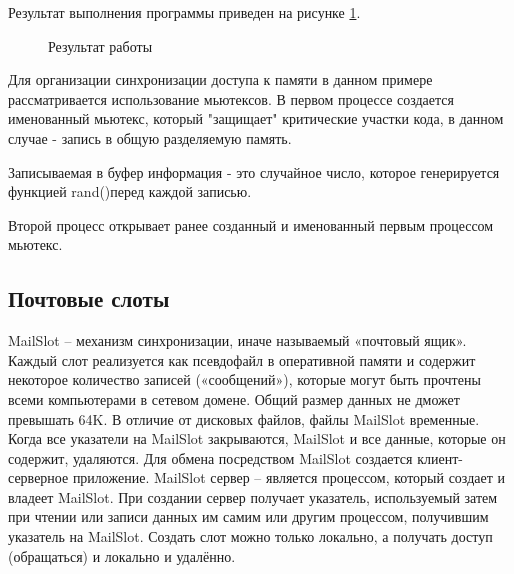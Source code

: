 \documentclass[a4paper]{article}
\begin{document}
	Результат выполнения программы приведен на рисунке \ref{img:task8}.
	\begin{figure}[h!]
		\caption{Результат работы}
		\label{img:task8}
	\end{figure}
	
	Для организации синхронизации доступа к памяти в данном примере рассматривается использование мьютексов. В первом процессе создается именованный мьютекс, который "защищает" критические участки кода, в данном случае - запись в общую разделяемую память.
	
	Записываемая в буфер информация - это случайное число, которое генерируется функцией rand()перед каждой записью.
	
	Второй процесс открывает ранее созданный и именованный первым процессом мьютекс.
	
\subsection{Почтовые слоты}
	MailSlot – механизм синхронизации, иначе называемый «почтовый ящик». Каждый слот реализуется как псевдофайл в оперативной памяти и содержит некоторое количество записей («сообщений»), которые могут быть прочтены всеми компьютерами в сетевом домене. Общий размер данных не дможет превышать 64K. В отличие от дисковых файлов, файлы MailSlot временные. Когда все указатели на MailSlot закрываются, MailSlot и все данные, которые он содержит, удаляются. Для обмена посредством MailSlot создается клиент-серверное приложение. MailSlot сервер – является процессом, который создает и владеет MailSlot. При создании сервер получает указатель, используемый затем при чтении или записи данных им самим или другим процессом, получившим указатель на MailSlot. Создать слот можно только локально, а получать доступ (обращаться) и локально и удалённо.
	
\end{document}

